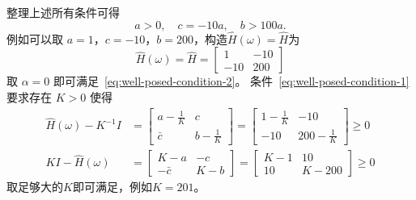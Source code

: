 \begin{solution*}
    整理上述所有条件可得
    \[
        a > 0,\quad c = -10 a,\quad b > 100 a.
    \]
    例如可以取 $a=1$，$c = -10$，$b = 200$，构造$\widehat{H}(\omega)=\widehat{H}$为
    \[
        \widehat{H}(\omega)=\widehat{H}=\begin{bmatrix}
            1   & -10 \\
            -10 & 200
        \end{bmatrix}
    \]
    取 $\alpha = 0$ 即可满足~\eqref{eq:well-posed-condition-2}。
    条件~\eqref{eq:well-posed-condition-1} 要求存在 $K > 0$ 使得
    \begin{align*}
        \widehat{H}(\omega)-K^{-1}I & =
        \begin{bmatrix}
            a - \frac{1}{K} & c              \\
            \bar{c}         & b -\frac{1}{K}
        \end{bmatrix}
        =
        \begin{bmatrix}
            1 - \frac{1}{K} & -10              \\
            -10             & 200 -\frac{1}{K}
        \end{bmatrix}
        \ge 0
        \\
        K I-\widehat{H}(\omega)     & =
        \begin{bmatrix}
            K - a    & -c  \\
            -\bar{c} & K-b
        \end{bmatrix}
        =
        \begin{bmatrix}
            K - 1 & 10    \\
            10    & K-200
        \end{bmatrix}
        \ge 0
    \end{align*}
    取足够大的$K$即可满足，例如$K=201$。
\end{solution*}

